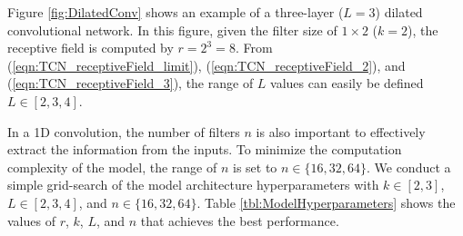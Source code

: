 Figure \ref{fig:DilatedConv} shows an example of a three-layer ($L=3$) dilated convolutional network.
In this figure, given the filter size of $1 \times 2$ ($k = 2$), the receptive field is computed by $r = 2^{3} = 8$.
From (\ref{eqn:TCN_receptiveField_limit}), (\ref{eqn:TCN_receptiveField_2}), and (\ref{eqn:TCN_receptiveField_3}), the range of $L$ values can easily be defined $L \in [2, 3, 4]$.

In a 1D convolution, the number of filters $n$ is also important to effectively extract the information from the inputs.
To minimize the computation complexity of the model, the range of $n$ is set to $n \in \{16, 32, 64\}$.
We conduct a simple grid-search of the model architecture hyperparameters with $k \in [2, 3]$, $L \in [2, 3, 4]$, and $n \in \{16, 32, 64\}$.
Table \ref{tbl:ModelHyperparameters} shows the values of $r$, $k$, $L$, and $n$ that achieves the best performance.


